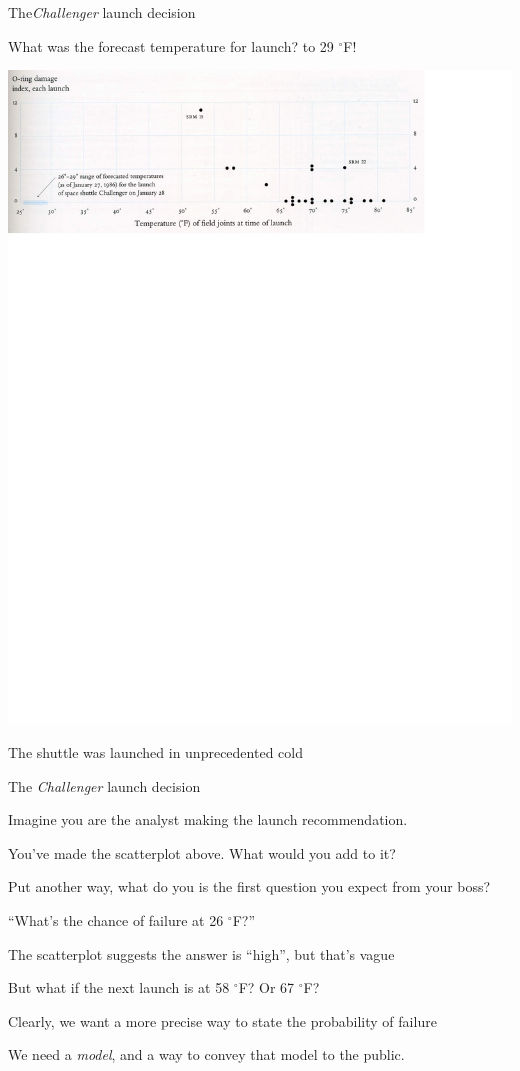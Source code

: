 \documentclass[11pt]{beamer}
\begin{document}
\begin{frame}{The\emph{Challenger} launch decision}

What was the forecast temperature for launch?   to 29 $^{\circ}$F! \pause

\begin{center}
\includegraphics[scale=.65]{tufte_challenger_2}
\end{center}


The shuttle was launched in unprecedented cold
\end{frame}


\begin{frame}{The \textit{Challenger} launch decision}

\small{
Imagine you are the analyst making the launch recommendation.

You've made the scatterplot above.  What would you add to it?

Put another way, what do you is the first question you expect from your boss? \pause

``What's the chance of failure at 26 $^{\circ}$F?'' \pause

The scatterplot suggests the answer is ``high'', but that's vague \pause

But what if the next launch is at 58 $^{\circ}$F?  Or 67 $^{\circ}$F? \pause

Clearly, we want a more precise way to state the probability of failure

We need a \textit{model}, and a way to convey that model to the public.}
\end{frame}
\end{document}
